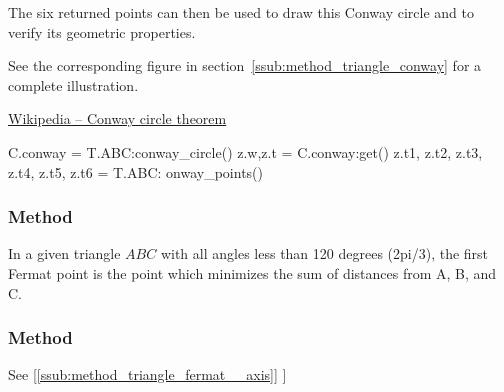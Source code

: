 The six returned points can then be used to draw this Conway circle and to verify its geometric properties.

\medskip

See  the corresponding figure in section~\ref{ssub:method_triangle_conway} for a complete illustration.
\begin{flushright}
\small
\href{https://en.wikipedia.org/wiki/Conway_circle_theorem}{Wikipedia – Conway circle theorem}
\end{flushright}

\vspace{1em}

\begin{mybox}
\begin{tkzexample}
  C.conway = T.ABC:conway_circle()
  z.w,z.t  = C.conway:get() %
  z.t1, z.t2, z.t3, z.t4, z.t5, z.t6 = T.ABC: onway_points()
\end{tkzexample}
\end{mybox}

\subsubsection{Method }
\label{ssub:method_triangle_first_fermat_point}
In a given triangle $ABC$ with all angles less than  120 degrees (2pi/3), the first Fermat point  is the point  which minimizes the sum of distances from A, B, and C.


\begin{tkzexample}[latex=.5\textwidth]
\end{tkzexample}

\subsubsection{Method }
\label{ssub:method_triangle_second__fermat__point}
See  [\ref{ssub:method_triangle_fermat__axis}]
]

